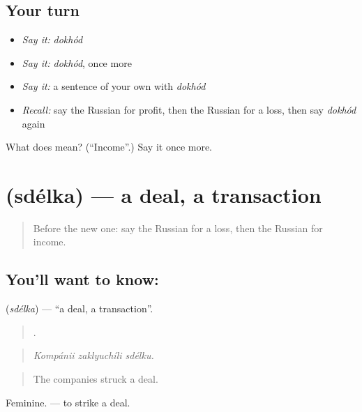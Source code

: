 \subsection*{Your turn}
\begin{itemize}
\raggedright
  \item \emph{Say it:} \emph{dokhód}
  \item \emph{Say it:} \emph{dokhód}, once more
  \item \emph{Say it:} a sentence of your own with \emph{dokhód}
  \item \emph{Recall:} say the Russian for profit, then the Russian for a loss, then say \emph{dokhód} again
\end{itemize}

\begin{tcolorbox}[breakable,colback=teal!4,colframe=teal!35!black,title={Before you move on}]
What does  mean? (\textquotedblleft{}Income\textquotedblright{}.) Say it once more.
\end{tcolorbox}
\section[\texorpdfstring{\ru{сделка} (sdélka)}{сделка (sdélka)}]{ (sdélka) — a deal, a transaction}

\label{lesson:RU-C361-sdelka}



\begin{quote}
Before the new one: say the Russian for a loss, then the Russian for income.
\end{quote}

\subsection*{You'll want to know: }
\textbf{} (\emph{sdélka}) — \textquotedblleft{}a deal, a transaction\textquotedblright{}.

\begin{quote}
  .
\end{quote}

\begin{quote}
\emph{Kompánii zaklyuchíli sdélku.}
\end{quote}

\begin{quote}
The companies struck a deal.
\end{quote}

Feminine. \emph{ } — to strike a deal.

